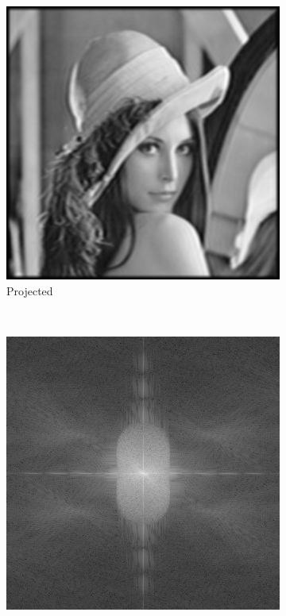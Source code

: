 \begin{figure}[h]
  \centering
  \begin{subfigure}[t]{0.23\textwidth}
      \centering
      \includegraphics[width=\textwidth]{sim_slit/recon/input}
      \caption{Projected}
  \end{subfigure}~
  \begin{subfigure}[t]{0.23\textwidth}
      \centering
      \includegraphics[width=\textwidth]{sim_slit/recon/FFT_input}

\end{subfigure}
\end{figure}

